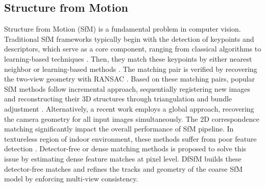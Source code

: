 \subsection{Structure from Motion}

Structure from Motion (SfM) is a fundamental problem in computer vision. Traditional SfM frameworks typically begin with the detection of keypoints and descriptors, which serve as a core component, ranging from classical algorithms \cite{SIFT} to learning-based techniques \cite{detone2018superpoint,sarlin2020superglue,revaud2019r2d2}. Then, they match these keypoints by either nearest neighbor \cite{schonberger2016structure} or learning-based methods \cite{sarlin2020superglue}. The matching pair is verified by recovering the two-view geometry \cite{hartley2003multiple} with RANSAC \cite{RANSAC}. Based on these matching pairs, popular SfM methods \cite{schonberger2016structure,moulon2017openmvg,sweeney2015theia} follow incremental approach, sequentially registering new images and reconstructing their 3D structures through triangulation \cite{hartley2003multiple} and bundle adjustment \cite{Bundleadjustment}. Alternatively, a recent work \cite{GLOMAP} employs a global approach, recovering the camera geometry for all input images simultaneously. The 2D correspondence matching significantly impact the overall performance of SfM pipeline. In textureless region of indoor environment, these methods suffer from poor feature detection \cite{he2024detector}. Detector-free or dense matching methods  \cite{sun2021loftr,edstedt2023dkm,edstedt2024roma} is proposed to solve this issue by estimating dense feature matches at pixel level. DfSfM \cite{he2024detector} builds these detector-free matches \cite{sun2021loftr} and refines the tracks and geometry of
the coarse SfM model by enforcing multi-view consistency. 

